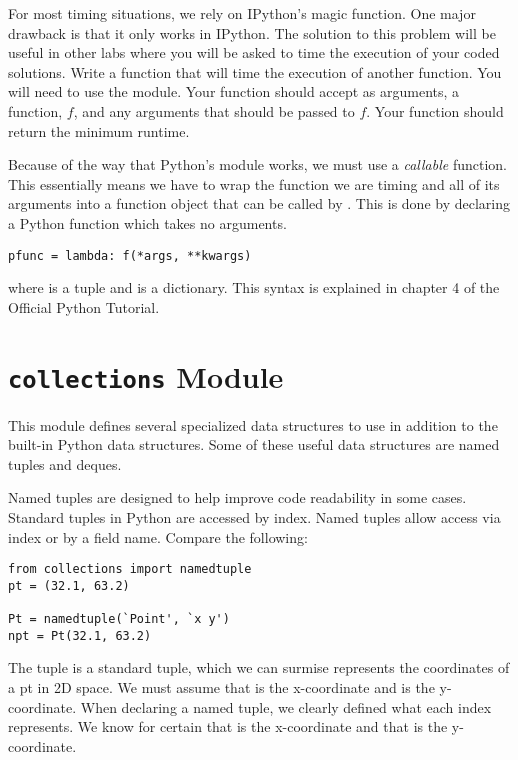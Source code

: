 \begin{problem}
For most timing situations, we rely on IPython's  magic function.
One major drawback is that it only works in IPython.
The solution to this problem will be useful in other labs where you will be asked to time the execution of your coded solutions.
Write a function that will time the execution of another function.
You will need to use the  module.
Your function should accept as arguments, a function, $f$, and any arguments that should be passed to $f$.
Your function should return the minimum runtime.

Because of the way that Python's  module works, we must use a \emph{callable} function.
This essentially means we have to wrap the function we are timing and all of its arguments into a function object that can be called by .
This is done by declaring a Python  function which takes no arguments.
\begin{lstlisting}
pfunc = lambda: f(*args, **kwargs)
\end{lstlisting}
where  is a tuple and  is a dictionary.
This syntax is explained in chapter 4 of the Official Python Tutorial.
\end{problem}

\section*{\texttt{collections} Module}
This module defines several specialized data structures to use in addition to the built-in Python data structures.
Some of these useful data structures are named tuples and deques.

Named tuples are designed to help improve code readability in some cases.
Standard tuples in Python are accessed by index.
Named tuples allow access via index or by a field name.
Compare the following:
\begin{lstlisting}
from collections import namedtuple
pt = (32.1, 63.2)

Pt = namedtuple(`Point', `x y')
npt = Pt(32.1, 63.2)
\end{lstlisting}
The tuple  is a standard tuple, which we can surmise represents the coordinates of a pt in 2D space.
We must assume that  is the x-coordinate and  is the y-coordinate.
When declaring a named tuple, we clearly defined what each index represents.
We know for certain that  is the x-coordinate and that  is the y-coordinate.

